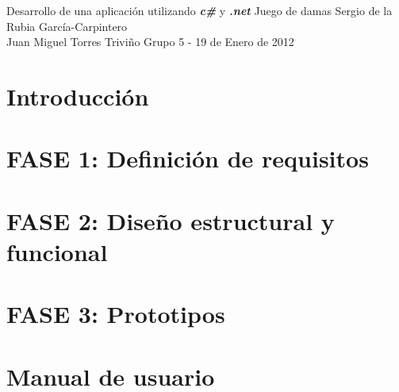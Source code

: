 \documentclass[11pt,a4paper,spanish,twoside]{report}
\begin{document}


{Desarrollo de una aplicación utilizando \emph{\textbf{c\#}} y
 \emph{\textbf{.net}}}
{Juego de damas}
{Sergio de la Rubia García-Carpintero \\Juan Miguel Torres Triviño}
{Grupo 5 - 19 de Enero de 2012}


\tableofcontents


\chapter{Introducción}


\chapter{FASE 1: Definición de requisitos}


\chapter{FASE 2: Diseño estructural y funcional}


\chapter{FASE 3: Prototipos}


\chapter{Manual de usuario}

\end{document}
